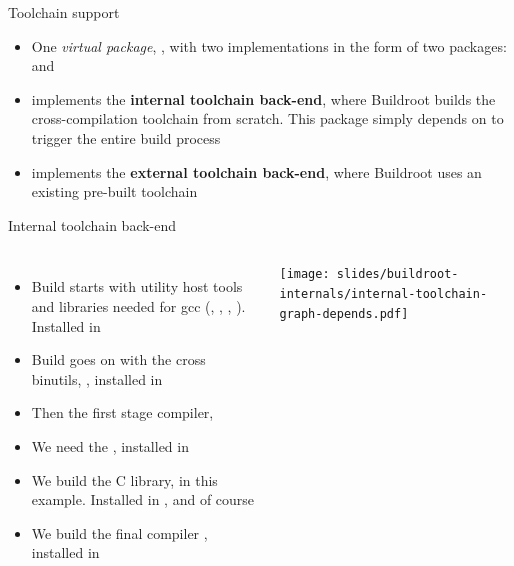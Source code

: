 \begin{frame}{Toolchain support}
  \begin{itemize}
  \item One {\em virtual package}, , with two
    implementations in the form of two packages:
     and 
  \item {} implements the {\bf internal
      toolchain back-end}, where Buildroot builds the cross-compilation
    toolchain from scratch. This package simply depends on
     to trigger the entire build process
  \item {} implements the {\bf external
      toolchain back-end}, where Buildroot uses an existing pre-built
    toolchain
  \end{itemize}
\end{frame}

\begin{frame}{Internal toolchain back-end}

\begin{columns}
  \begin{itemize}
    \footnotesize
  \item Build starts with utility host tools and libraries needed for
    gcc (, , ,
    ). Installed in
  \item Build goes on with the cross binutils, ,
    installed in 
  \item Then the first stage compiler, 
  \item We need the , installed in
  \item We build the C library,  in this example. Installed
    in , 
    and of course 
  \item We build the final compiler , installed
    in 
  \end{itemize}
  \texttt{[image: slides/buildroot-internals/internal-toolchain-graph-depends.pdf]}
\end{columns}

\end{frame}

